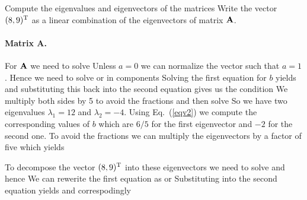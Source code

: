 

\label{exBeeEV}%
Compute the eigenvalues and eigenvectors of the matrices  
Write the vector $(8,9)^{\rm T}$ as a linear combination of the eigenvectors of matrix $\bf A$. 

\solution 
\paragraph{Matrix A.} For ${\bf A}$ we need to solve 
Unless $a=0$ we can normalize the vector such that $a=1$. Hence we need to solve 
or in components
Solving the first equation for $b$ yields 
and substituting this back into the second equation gives us the condition 
We multiply both sides by 5 to avoid the fractions and then solve
So we have two eigenvalues $\lambda_1 = 12$ and $\lambda_2=-4$. Using Eq.~(\ref{eqv2}) we compute the corresponding values of $b$ which are 
$6/5$ for the first eigenvector and $-2$ for the second one. To avoid the fractions we can multiply the eigenvectors by a factor of five which yields 

To decompose the vector $(8,9)^{\rm T}$ into these eigenvectors we need to solve 
and hence 
We can rewerite the first equation as 
or 
Substituting into the second equation yields
and correspodingly 

